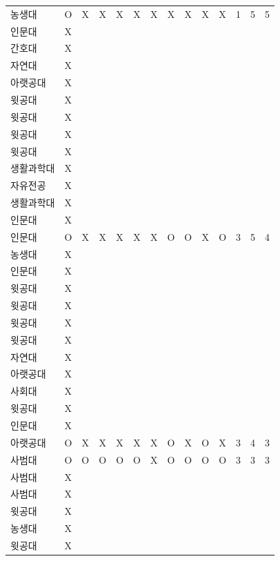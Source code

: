 \documentclass[11pt,a4paper]{article}
\begin{document}
\begin{center}
\begin{tabular}{ | p{2cm} | c | c | c | c | c | c | c | c | c | c | c | c | c | }
농생대 & O & X & X & X & X & X & X & X & X & X & 1 & 5 & 5 \\
인문대 & X & & & & & & & & & & & & \\
간호대 & X & & & & & & & & & & & & \\
자연대 & X & & & & & & & & & & & & \\
아랫공대 & X & & & & & & & & & & & & \\
윗공대 & X & & & & & & & & & & & & \\
윗공대 & X & & & & & & & & & & & & \\
윗공대 & X & & & & & & & & & & & & \\
윗공대 & X & & & & & & & & & & & & \\
생활과학대 & X & & & & & & & & & & & & \\
자유전공 & X & & & & & & & & & & & & \\
생활과학대 & X & & & & & & & & & & & & \\
인문대 & X & & & & & & & & & & & & \\
인문대 & O & X & X & X & X & X & O & O & X & O & 3 & 5 & 4 \\
농생대 & X & & & & & & & & & & & & \\
인문대 & X & & & & & & & & & & & & \\
윗공대 & X & & & & & & & & & & & & \\
윗공대 & X & & & & & & & & & & & & \\
윗공대 & X & & & & & & & & & & & & \\
윗공대 & X & & & & & & & & & & & & \\
자연대 & X & & & & & & & & & & & & \\
아랫공대 & X & & & & & & & & & & & & \\
사회대 & X & & & & & & & & & & & & \\
윗공대 & X & & & & & & & & & & & & \\
인문대 & X & & & & & & & & & & & & \\
아랫공대 & O & X & X & X & X & X & O & X & O & X & 3 & 4 & 3 \\
사범대 & O & O & O & O & O & X & O & O & O & O & 3 & 3 & 3 \\
사범대 & X & & & & & & & & & & & & \\
사범대 & X & & & & & & & & & & & & \\
윗공대 & X & & & & & & & & & & & & \\
농생대 & X & & & & & & & & & & & & \\
윗공대 & X & & & & & & & & & & & & \\

\end{tabular}
\end{center}
\end{document}
